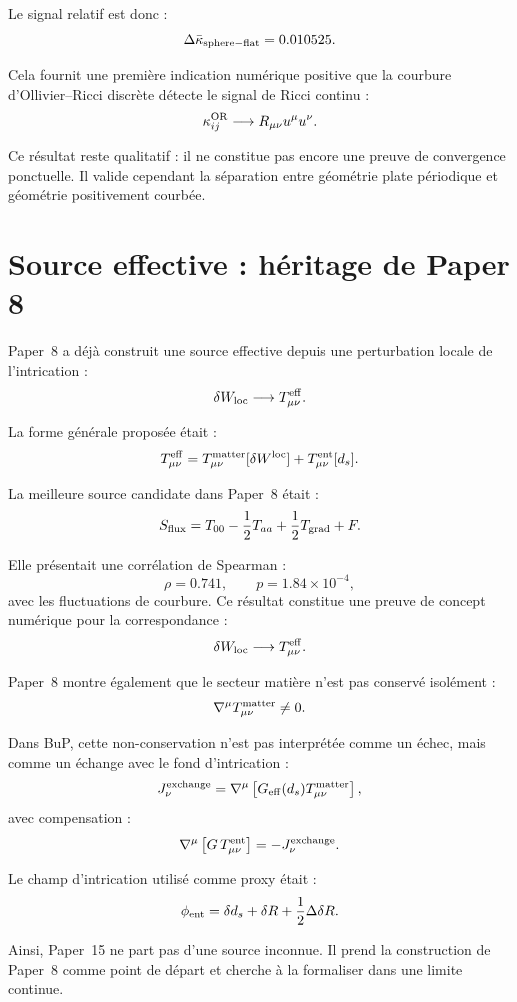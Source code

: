 \documentclass[11pt,a4paper]{article}
\begin{document}
Le signal relatif est donc :
\[
\Delta\bar\kappa_{\rm sphere-flat}=0.010525.
\]

Cela fournit une première indication numérique positive que la courbure
d'Ollivier--Ricci discrète détecte le signal de Ricci continu :
\[
\kappa_{ij}^{\rm OR}
\longrightarrow
R_{\mu\nu}u^\mu u^\nu.
\]

Ce résultat reste qualitatif : il ne constitue pas encore une preuve de
convergence ponctuelle. Il valide cependant la séparation entre géométrie
plate périodique et géométrie positivement courbée.

\section{Source effective : héritage de Paper 8}

Paper~8 a déjà construit une source effective depuis une perturbation locale
de l'intrication :
\[
\delta W_{\rm loc}
\longrightarrow
T_{\mu\nu}^{\rm eff}.
\]

La forme générale proposée était :
\[
T_{\mu\nu}^{\rm eff}
=
T_{\mu\nu}^{\rm matter}[\delta W^{\rm loc}]
+
T_{\mu\nu}^{\rm ent}[d_s].
\]

La meilleure source candidate dans Paper~8 était :
\[
S_{\rm flux}
=
T_{00}
-
\frac{1}{2}T_{aa}
+
\frac{1}{2}T_{\rm grad}
+
F.
\]

Elle présentait une corrélation de Spearman :
\[
\rho=0.741,
\qquad
p=1.84\times10^{-4},
\]
avec les fluctuations de courbure. Ce résultat constitue une preuve de concept
numérique pour la correspondance :
\[
\delta W_{\rm loc}
\longrightarrow
T_{\mu\nu}^{\rm eff}.
\]

Paper~8 montre également que le secteur matière n'est pas conservé isolément :
\[
\nabla^\mu T_{\mu\nu}^{\rm matter}\neq0.
\]

Dans BuP, cette non-conservation n'est pas interprétée comme un échec, mais
comme un échange avec le fond d'intrication :
\[
J_\nu^{\rm exchange}
=
\nabla^\mu
\left[
G_{\rm eff}(d_s)T_{\mu\nu}^{\rm matter}
\right],
\]
avec compensation :
\[
\nabla^\mu
\left[
G\,T_{\mu\nu}^{\rm ent}
\right]
=
-
J_\nu^{\rm exchange}.
\]

Le champ d'intrication utilisé comme proxy était :
\[
\phi_{\rm ent}
=
\delta d_s
+
\delta R
+
\frac{1}{2}\Delta\delta R.
\]

Ainsi, Paper~15 ne part pas d'une source inconnue. Il prend la construction
de Paper~8 comme point de départ et cherche à la formaliser dans une limite
continue.
\end{document}
